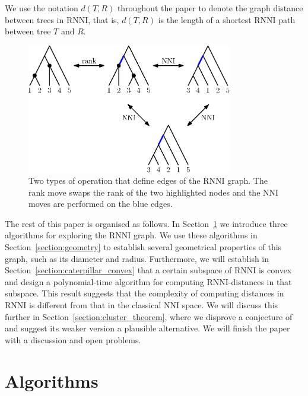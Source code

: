 \documentclass{amsart}
\newcommand{\nni}{\mathrm{NNI}}
\newcommand{\rnni}{\mathrm{RNNI}}
\begin{document}
We use the notation $d(T, R)$ throughout the paper to denote the graph distance between trees in $\rnni$, that is, $d(T, R)$ is the length of a shortest $\rnni$ path between tree $T$ and $R$.

\begin{figure}[H]
\centering
\includegraphics[width=0.8\textwidth]{RNNI}
\vspace{12pt}
\caption{Two types of operation that define edges of the $\rnni$ graph.
The rank move swaps the rank of the two highlighted nodes and the $\nni$ moves are performed on the blue edges.}
\label{fig:RNNI}
\end{figure}

The rest of this paper is organised as follows.
In Section~\ref{section:algorithms} we introduce three algorithms for exploring the $\rnni$ graph.
We use these algorithms in Section~\ref{section:geometry} to establish several geometrical properties of this graph, such as its diameter and radius.
Furthermore, we will establish in Section~\ref{section:caterpillar_convex} that a certain subspace of $\rnni$ is convex and design a polynomial-time algorithm for computing $\rnni$-distances in that subspace.
This result suggests that the complexity of computing distances in $\rnni$ is different from that in the classical $\nni$ space.
We will discuss this further in Section~\ref{section:cluster_theorem}, where we disprove a conjecture of \textcite{Gavryushkin2018-ol} and suggest its weaker version a plausible alternative.
We will finish the paper with a discussion and open problems.


\section{Algorithms}
\label{section:algorithms}
\end{document}
